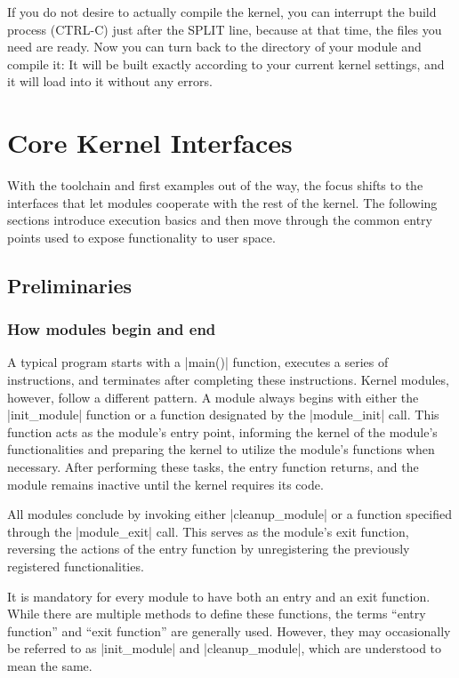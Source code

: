 \documentclass[10pt, oneside]{book}
\begin{document}
If you do not desire to actually compile the kernel, you can interrupt the build process (CTRL-C) just after the SPLIT line, because at that time, the files you need are ready.
Now you can turn back to the directory of your module and compile it: It will be built exactly according to your current kernel settings, and it will load into it without any errors.

\chapter{Core Kernel Interfaces}
With the toolchain and first examples out of the way, the focus shifts to the
interfaces that let modules cooperate with the rest of the kernel. The
following sections introduce execution basics and then move through the common
entry points used to expose functionality to user space.

\section{Preliminaries}
\subsection{How modules begin and end}
\label{sec:module_init_exit}
A typical program starts with a \cpp|main()| function, executes a series of instructions,
and terminates after completing these instructions.
Kernel modules, however, follow a different pattern.
A module always begins with either the \cpp|init_module| function or a function designated by the \cpp|module_init| call.
This function acts as the module's entry point,
informing the kernel of the module's functionalities and preparing the kernel to utilize the module's functions when necessary.
After performing these tasks, the entry function returns, and the module remains inactive until the kernel requires its code.

All modules conclude by invoking either \cpp|cleanup_module| or a function specified through the \cpp|module_exit| call.
This serves as the module's exit function, reversing the actions of the entry function by unregistering the previously registered functionalities.

It is mandatory for every module to have both an entry and an exit function.
While there are multiple methods to define these functions, the terms ``entry function'' and ``exit function'' are generally used.
However, they may occasionally be referred to as \cpp|init_module| and \cpp|cleanup_module|,
which are understood to mean the same.
\end{document}
